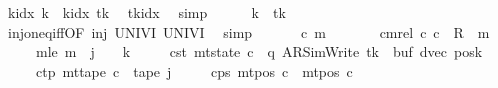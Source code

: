 \begin{isabellebody}
\ {\isachardoublequoteopen}k{\isacharunderscore}{\kern0pt}idx\ k\ {\isacharequal}{\kern0pt}\ k{\isacharunderscore}{\kern0pt}idx\ {\isacharquery}{\kern0pt}tk{\isachardoublequoteclose}\ \isamarkupfalse%
\ tkidx\ \isamarkupfalse%
\ simp\isanewline
\ \ \ \ \isamarkupfalse%
\ {\isachardoublequoteopen}k\ {\isacharequal}{\kern0pt}\ {\isacharquery}{\kern0pt}tk{\isachardoublequoteclose}\ \isamarkupfalse%
\ inj{\isacharunderscore}{\kern0pt}on{\isacharunderscore}{\kern0pt}eq{\isacharunderscore}{\kern0pt}iff{\isacharbrackleft}{\kern0pt}OF\ inj\ UNIV{\isacharunderscore}{\kern0pt}I\ UNIV{\isacharunderscore}{\kern0pt}I{\isacharbrackright}{\kern0pt}\ \isamarkupfalse%
\ simp\isanewline
\ \ \isamarkupfalse%
\isanewline
\ \ \isamarkupfalse%
\ c\ m\ \isanewline
\ \ \ \ \ \ cm{\isacharunderscore}{\kern0pt}rel{\isacharcolon}{\kern0pt}\ {\isachardoublequoteopen}{\isacharparenleft}{\kern0pt}c{}{\isacharcomma}{\kern0pt}\ c{\isacharparenright}{\kern0pt}\ {\isasymin}\ R{\isacharprime}{\kern0pt}\ {\isacharcircum}{\kern0pt}{\isacharcircum}{\kern0pt}\ m{\isachardoublequoteclose}\isanewline
\ \ \ \ \ m{\isacharunderscore}{\kern0pt}le{\isacharcolon}{\kern0pt}\ {\isachardoublequoteopen}m\ {\isasymle}\ j\ {\isacharasterisk}{\kern0pt}\ {\isacharparenleft}{\kern0pt}{}\ {\isacharasterisk}{\kern0pt}\ {\isacharquery}{\kern0pt}k{\isacharparenright}{\kern0pt}{\isachardoublequoteclose}\isanewline
\ \ \ \ \ c{\isacharunderscore}{\kern0pt}st{\isacharcolon}{\kern0pt}\ {\isachardoublequoteopen}mt{\isacharunderscore}{\kern0pt}state\ c\ {\isacharequal}{\kern0pt}\ {\isacharparenleft}{\kern0pt}q{\isacharcomma}{\kern0pt}\ AR{\isacharunderscore}{\kern0pt}SimWrite{\isacharcomma}{\kern0pt}\ {\isacharquery}{\kern0pt}tk{\isacharcomma}{\kern0pt}\ {}{\isacharcomma}{\kern0pt}\ buf{\isacharcomma}{\kern0pt}\ dvec{\isacharcomma}{\kern0pt}\ posk{\isacharparenright}{\kern0pt}{\isachardoublequoteclose}\isanewline
\ \ \ \ \ c{\isacharunderscore}{\kern0pt}tp{\isacharcolon}{\kern0pt}\ {\isachardoublequoteopen}mt{\isacharunderscore}{\kern0pt}tape\ c\ {\isacharequal}{\kern0pt}\ {\isacharquery}{\kern0pt}tape\ j{\isachardoublequoteclose}\isanewline
\ \ \ \ \ c{\isacharunderscore}{\kern0pt}ps{\isacharcolon}{\kern0pt}\ {\isachardoublequoteopen}mt{\isacharunderscore}{\kern0pt}pos\ c\ {\isacharequal}{\kern0pt}\ mt{\isacharunderscore}{\kern0pt}pos\ c{}{\isachardoublequoteclose}\isanewline

\end{isabellebody}
